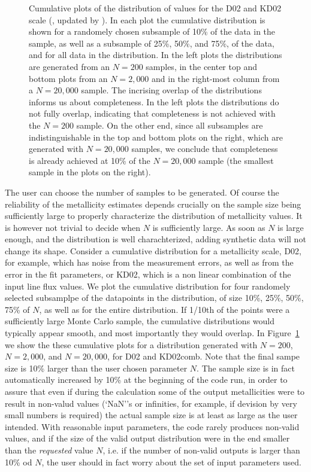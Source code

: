 \documentclass{emulateapj}
\begin{document}
\begin{figure}[!ht]
\caption{Cumulative plots of the distribution of values for the D02 \citep{denicolo02} and KD02 scale (\citealt{kewley02}, updated by \citealt{kewley08}). In each plot the cumulative distribution is shown for a randomely chosen subsample of 10\% of the data in the sample, as well as a subsample of 25\%, 50\%, and 75\%, of the data, and for all data in the distribution. In the left plots the distributions are generated from an $N=200$ samples, in the center top and bottom plots from an $N=2,000$  and in the right-most column from a $N=20,000$ sample. The incrising overlap of the distributions informs us about completeness. In the left plots the distributions do not fully overlap, indicating that completeness is not achieved with the $N=200$ sample. On the other end, since all subsamples are indistinguishable in the top and bottom plots on the right, which are generated with $N=20,000$ samples, we conclude that completeness is  already  achieved at 10\% of the $N=20,000$ sample (the smallest sample in the plots on the right).}
 \label{cd}
\end{figure}
The user can choose the number of samples to be generated. Of course the reliability of the metallicity estimates depends crucially on the sample size being sufficiently large to properly characterize the distribution of metallicity values. It is however not trivial to decide when $N$ is sufficiently large. As soon as $N$ is large enough, and the distribution is well charachterized, adding synthetic data will not change its shape. Consider a cumulative distribution for a metallicity scale, D02, for example, which has noise from the measurement errors, as well as from the error in the fit parameters, or KD02, which is a non linear combination of the input line flux values. We plot the cumulative distribution for four randomely selected subsamplpe of the datapoints in the distribution, of size 10\%, 25\%, 50\%, 75\% of $N$, as well as for the entire distribution. If 1/10th of the points were a sufficiently large Monte Carlo sample, the cumulative distributions would typically appear smooth, and most importantly they would overlap. In Figure~\ref{cd} we show the these cumulative plots for a distribution generated with $N=200$, $N=2,000$, and $N=20,000$, for D02 and KD02comb. Note that the final sampe size is 10\% larger than the user chosen parameter $N$. The sample size is in fact automatically increased by 10\% at the beginning of the code run, in order to assure that even if during the calculation some of the output metallicities were to result in non-valud values (`NaN''s or infinities, for example, if devision by very small numbers is required) the actual sample size is at least as large as the user intended. With reasonable input parameters, the code rarely produces non-valid values, and if the size of the valid output distribution were in the end smaller than the \emph{requested} value $N$, i.e. if the number of non-valid outputs is larger than 10\% od $N$, the user should in fact worry about the set of input parameters used. 
\end{document}
